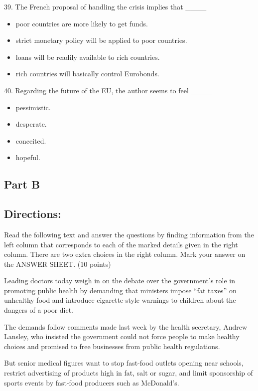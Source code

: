 \documentclass[UTF8,11pt]{ctexart}
\begin{document}
39. The French proposal of handling the crisis implies that \_\_\_\_


\begin{itemize}[leftmargin=2em,itemsep=.2em,topsep=.4em]\item[A.] poor countries are more likely to get funds.
\item[B.] strict monetary policy will be applied to poor countries.
\item[C.] loans will be readily available to rich countries.
\item[D.] rich countries will basically control Eurobonds.
\end{itemize}

40. Regarding the future of the EU, the author seems to feel \_\_\_\_


\begin{itemize}[leftmargin=2em,itemsep=.2em,topsep=.4em]\item[A.] pessimistic.
\item[B.] desperate.
\item[C.] conceited.
\item[D.] hopeful.
\end{itemize}

\subsection*{\textbf{Part B}}


\subsection*{\textbf{Directions:}}


Read the following text and answer the questions by finding information from the left column that corresponds to each of the marked details given in the right column. There are two extra choices in the right column. Mark your answer on the ANSWER SHEET. (10 points)


Leading doctors today weigh in on the debate over the government’s role in promoting public health by demanding that ministers impose “fat taxes” on unhealthy food and introduce cigarette-style warnings to children about the dangers of a poor diet.


The demands follow comments made last week by the health secretary, Andrew Lansley, who insisted the government could not force people to make healthy choices and promised to free businesses from public health regulations.


But senior medical figures want to stop fast-food outlets opening near schools, restrict advertising of products high in fat, salt or sugar, and limit sponsorship of sports events by fast-food producers such as McDonald’s.
\end{document}
